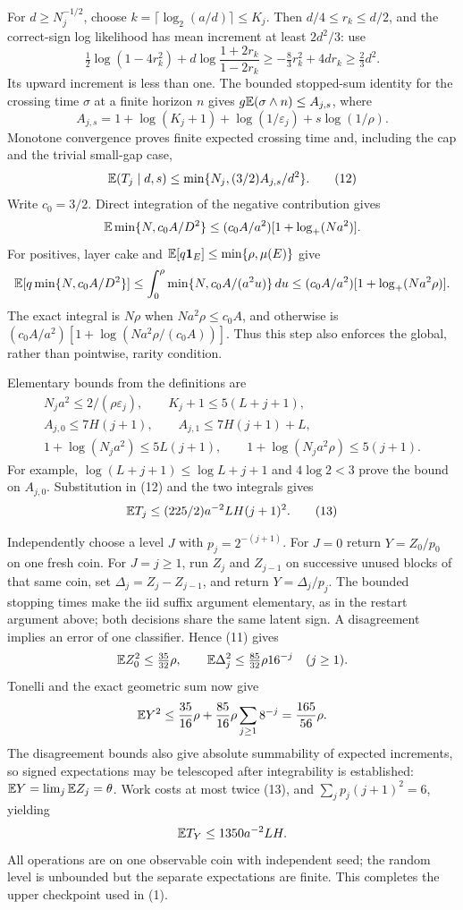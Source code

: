 For $d\ge N_j^{-1/2}$, choose $k=\lceil\log_2(a/d)\rceil\le K_j$.
Then $d/4\le r_k\le d/2$, and the correct-sign log likelihood has mean
increment at least $2d^2/3$: use
\[
 \tfrac12\log(1-4r_k^2)
       +d\log\frac{1+2r_k}{1-2r_k}
 \ge-\tfrac83r_k^2+4dr_k\ge\tfrac23d^2.
\]
Its upward increment is less than one. The bounded stopped-sum identity for
the crossing time $\sigma$ at a finite horizon $n$ gives
$g\mathbb E(\sigma\wedge n)\le A_{j,s}$, where
\[
 A_{j,s}=1+\log(K_j+1)+\log(1/\varepsilon_j)+s\log(1/\rho).
\]
Monotone convergence proves finite expected crossing time and, including the
cap and the trivial small-gap case,
\[
 \mathbb E(T_j\mid d,s)\le\min\{N_j,(3/2)A_{j,s}/d^2\}.        \tag{12}
\]
Write $c_0=3/2$. Direct integration of the negative contribution gives
\[
 \mathbb E\min\{N,c_0A/D^2\}
 \le(c_0A/a^2)[1+\log_+(Na^2)].
\]
For positives, layer cake and
$\mathbb E[q\mathbf1_E]\le\min\{\rho,\mu(E)\}$ give
\[
 \mathbb E[q\min\{N,c_0A/D^2\}]
 \le\int_0^\rho\min\{N,c_0A/(a^2u)\}\,du
 \le(c_0A/a^2)[1+\log_+(Na^2\rho)].
\]
The exact integral is $N\rho$ when $Na^2\rho\le c_0A$, and otherwise is
$(c_0A/a^2)[1+\log(Na^2\rho/(c_0A))]$. Thus this step also enforces the
global, rather than pointwise, rarity condition.

Elementary bounds from the definitions are
\[
\begin{gathered}
 N_ja^2\le2/(\rho\varepsilon_j),\qquad K_j+1\le5(L+j+1),\\
 A_{j,0}\le7H(j+1),\qquad A_{j,1}\le7H(j+1)+L,\\
 1+\log(N_ja^2)\le5L(j+1),\qquad
 1+\log(N_ja^2\rho)\le5(j+1).
\end{gathered}
\]
For example, $\log(L+j+1)\le\log L+j+1$ and $4\log2<3$ prove the
bound on $A_{j,0}$. Substitution in (12) and the two integrals gives
\[
 \mathbb E T_j\le(225/2)a^{-2}LH(j+1)^2.                        \tag{13}
\]

Independently choose a level $J$ with $p_j=2^{-(j+1)}$. For $J=0$ return
$Y=Z_0/p_0$ on one fresh coin. For $J=j\ge1$, run $Z_j$ and $Z_{j-1}$
on successive unused blocks of that same coin, set $\Delta_j=Z_j-Z_{j-1}$,
and return $Y=\Delta_j/p_j$. The bounded stopping times make the iid suffix
argument elementary, as in the restart argument above; both decisions share
the same latent sign. A disagreement implies an error of one classifier.
Hence (11) gives
\[
 \mathbb E Z_0^2\le\tfrac{35}{32}\rho,
 \qquad \mathbb E\Delta_j^2\le\tfrac{85}{32}\rho16^{-j}\quad(j\ge1).
\]
Tonelli and the exact geometric sum now give
\[
 \mathbb E Y^2\le\frac{35}{16}\rho+
                 \frac{85}{16}\rho\sum_{j\ge1}8^{-j}
            =\frac{165}{56}\rho.
\]
The disagreement bounds also give absolute summability of expected increments,
so signed expectations may be telescoped after integrability is established:
$\mathbb E Y=\lim_j\mathbb E Z_j=\theta$. Work costs at most twice (13), and
$\sum_jp_j(j+1)^2=6$, yielding
\[
 \mathbb E T_Y\le1350a^{-2}LH.
\]
All operations are on one observable coin with independent seed; the random
level is unbounded but the separate expectations are finite. This completes
the upper checkpoint used in (1).

